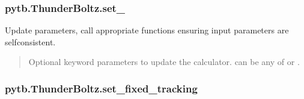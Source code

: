 \documentclass[letterpaper,10pt,english,openany,oneside]{sphinxmanual}
\begin{document}
\begin{fulllineitems}
\begin{fulllineitems}
\begin{quote}
\begin{description}
\end{description}\end{quote}

\end{fulllineitems}


\sphinxstepscope


\subsubsection{pytb.ThunderBoltz.set\_}
\label{\detokenize{api/pytb.ThunderBoltz.set_:pytb-thunderboltz-set}}\label{\detokenize{api/pytb.ThunderBoltz.set_::doc}}

\begin{fulllineitems}
\label{\detokenize{api/pytb.ThunderBoltz.set_:pytb.ThunderBoltz.set_}}
\pysigstartsignatures
{}
\pysigstopsignatures
\sphinxAtStartPar
Update parameters, call appropriate functions ensuring
input parameters are self\sphinxhyphen{}consistent.
\begin{quote}\begin{description}
\sphinxAtStartPar
{} \textendash{} Optional keyword parameters to update the calculator.
can be any of {\hyperref[\detokenize{api/pytb.parameters.TBParameters:pytb.parameters.TBParameters}]{}} or
{\hyperref[\detokenize{api/pytb.parameters.WrapParameters:pytb.parameters.WrapParameters}]{}}.

\end{description}\end{quote}

\end{fulllineitems}


\sphinxstepscope


\subsubsection{pytb.ThunderBoltz.set\_fixed\_tracking}
\label{\detokenize{api/pytb.ThunderBoltz.set_fixed_tracking:pytb-thunderboltz-set-fixed-tracking}}\label{\detokenize{api/pytb.ThunderBoltz.set_fixed_tracking::doc}}


\end{fulllineitems}
\end{document}
